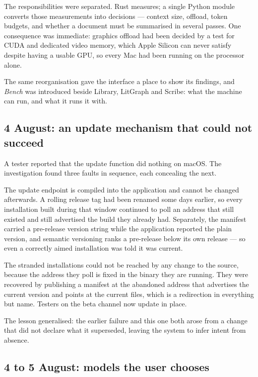 \documentclass[11pt,a4paper]{article}
\begin{document}
The responsibilities were separated. Rust measures; a single Python module
converts those measurements into decisions --- context size, offload, token
budgets, and whether a document must be summarised in several passes. One
consequence was immediate: graphics offload had been decided by a test for CUDA
and dedicated video memory, which Apple Silicon can never satisfy despite
having a usable GPU, so every Mac had been running on the processor alone.

The same reorganisation gave the interface a place to show its findings, and
\emph{Bench} was introduced beside Library, LitGraph and Scribe: what the
machine can run, and what it runs it with.

\subsection{4 August: an update mechanism that could not succeed}

A tester reported that the update function did nothing on macOS. The
investigation found three faults in sequence, each concealing the next.

The update endpoint is compiled into the application and cannot be changed
afterwards. A rolling release tag had been renamed some days earlier, so every
installation built during that window continued to poll an address that still
existed and still advertised the build they already had. Separately, the
manifest carried a pre-release version string while the application reported
the plain version, and semantic versioning ranks a pre-release below its own
release --- so even a correctly aimed installation was told it was current.

The stranded installations could not be reached by any change to the source,
because the address they poll is fixed in the binary they are running. They
were recovered by publishing a manifest at the abandoned address that advertises
the current version and points at the current files, which is a redirection in
everything but name. Testers on the beta channel now update in place.

The lesson generalised: the earlier failure and this one both arose from a
change that did not declare what it superseded, leaving the system to infer
intent from absence.

\subsection{4 to 5 August: models the user chooses}
\end{document}
